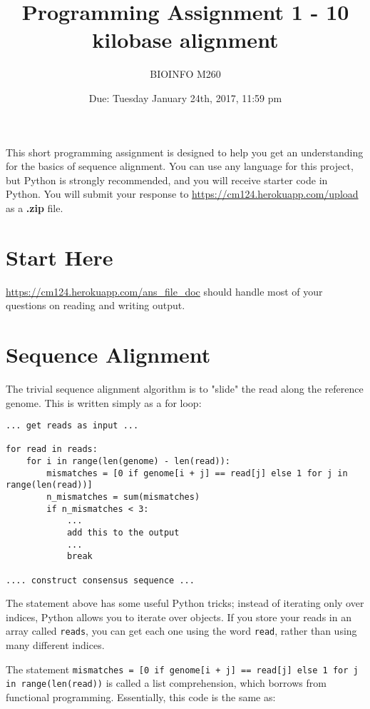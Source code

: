 \documentclass{article}
\begin{document}
\title{Programming Assignment 1 - 10 kilobase alignment}

\author{BIOINFO M260}

\date{Due: Tuesday January 24th, 2017, 11:59 pm}

\maketitle

This short programming assignment is designed to help you get an
understanding for the basics of sequence alignment. You can use any language
for this project, but Python is strongly recommended, and you will receive starter code in Python. You will submit your response to \url{https://cm124.herokuapp.com/upload} as a \textbf{.zip} file.

\section*{Start Here}
\url{https://cm124.herokuapp.com/ans_file_doc} should handle most of your questions on reading and writing output.

\section*{Sequence Alignment}
The trivial sequence alignment algorithm is to "slide" the read along the reference genome. This is written simply as a for loop:

\begin{verbatim}
... get reads as input ...

for read in reads:
    for i in range(len(genome) - len(read)):
	    mismatches = [0 if genome[i + j] == read[j] else 1 for j in range(len(read))]
	    n_mismatches = sum(mismatches)
	    if n_mismatches < 3:
		    ...
		    add this to the output
		    ...
		    break
		    
.... construct consensus sequence ...
\end{verbatim}

The statement above has some useful Python tricks; instead of iterating only over indices, Python allows you to iterate over objects. If you store your reads in an array called \verb!reads!, you can get each one using the word \verb!read!, rather than using many different indices.

The statement \verb~mismatches = [0 if genome[i + j] == read[j] else 1 for j in range(len(read))~ is called a list comprehension, which borrows from functional programming. Essentially, this code is the same as:
\end{document}
